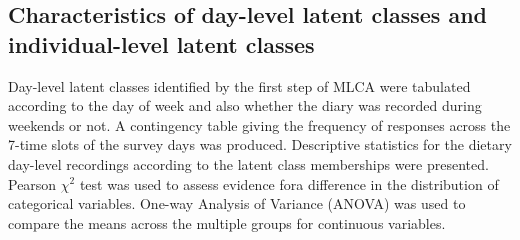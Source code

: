 %
%
%



\subsection{Characteristics of day-level latent classes and individual-level latent classes}\vspace{-0.3cm}


Day-level latent classes identified by the first step of MLCA were tabulated according to the day of week and also whether the diary was recorded during weekends or not. A contingency table giving the frequency of responses across the 7-time slots of the survey days was produced. Descriptive statistics for the dietary day-level recordings according to the latent class memberships were presented. Pearson $\chi^2$ test was used to assess evidence fora difference in the distribution of categorical variables. One-way Analysis of Variance (ANOVA) was used to compare the means across the multiple groups for continuous variables.

